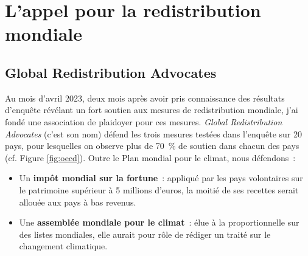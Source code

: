 \documentclass[a5paper,french]{memoir}
\begin{document}


\chapter{L'appel pour la redistribution mondiale\label{ch:appel}}

\section{Global Redistribution Advocates}

Au mois d'avril 2023, deux mois après avoir pris connaissance des résultats d'enquête révélant un fort soutien aux mesures de redistribution mondiale, j'ai fondé une association de plaidoyer pour ces mesures. \textit{Global Redistribution Advocates} (c'est son nom) défend les trois mesures testées dans l'enquête sur 20 pays, pour lesquelles on observe plus de 70~\% de soutien dans chacun des pays (cf. Figure \ref{fig:oecd}). Outre le Plan mondial pour le climat, nous défendons~: 
\begin{itemize}
  \item Un \textbf{impôt mondial sur la fortune}~: appliqué par les pays volontaires sur le patrimoine supérieur à 5 millions d'euros, la moitié de ses recettes serait allouée aux pays à bas revenus.
  \item Une \textbf{assemblée mondiale pour le climat}~: élue à la proportionnelle sur des listes mondiales, elle aurait pour rôle de rédiger un traité sur le changement climatique.
\end{itemize}
\end{document}
